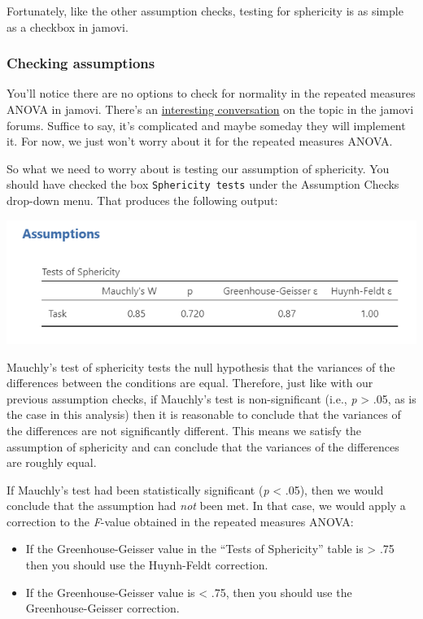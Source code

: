 \documentclass[
]{book}
\providecommand{\tightlist}{%
  \setlength{\itemsep}{0pt}\setlength{\parskip}{0pt}}
\begin{document}
Fortunately, like the other assumption checks, testing for sphericity is as simple as a checkbox in jamovi.

\hypertarget{checking-assumptions-5}{%
\subsubsection{Checking assumptions}\label{checking-assumptions-5}}

You'll notice there are no options to check for normality in the repeated measures ANOVA in jamovi. There's an \href{https://forum.jamovi.org/viewtopic.php?f=5\&t=1045}{interesting conversation} on the topic in the jamovi forums. Suffice to say, it's complicated and maybe someday they will implement it. For now, we just won't worry about it for the repeated measures ANOVA.

So what we need to worry about is testing our assumption of sphericity. You should have checked the box \texttt{Sphericity\ tests} under the Assumption Checks drop-down menu. That produces the following output:

\includegraphics{images/05-repeated-measures-anova/rm-anova_sphericity.png}

Mauchly's test of sphericity tests the null hypothesis that the variances of the differences between the conditions are equal. Therefore, just like with our previous assumption checks, if Mauchly's test is non-significant (i.e., \emph{p} \textgreater{} .05, as is the case in this analysis) then it is reasonable to conclude that the variances of the differences are not significantly different. This means we satisfy the assumption of sphericity and can conclude that the variances of the differences are roughly equal.

If Mauchly's test had been statistically significant (\emph{p} \textless{} .05), then we would conclude that the assumption had \emph{not} been met. In that case, we would apply a correction to the \emph{F}-value obtained in the repeated measures ANOVA:

\begin{itemize}
\tightlist
\item
  If the Greenhouse-Geisser value in the ``Tests of Sphericity'' table is \textgreater{} .75 then you should use the Huynh-Feldt correction.
\item
  If the Greenhouse-Geisser value is \textless{} .75, then you should use the Greenhouse-Geisser correction.
\end{itemize}
\end{document}
